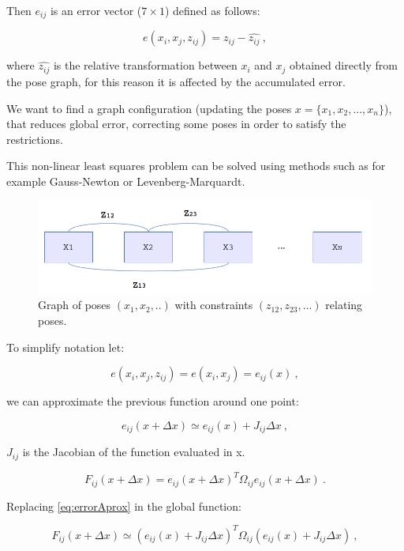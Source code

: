 Then $e_{ij}$ is an error vector ($7\times1$) defined as follows:

$$
e(x_i,x_j,z_{ij}) = z_{ij} - \hat{z_{ij}} \ ,
$$

\noindent where $\hat{z_{ij}}$ is the relative transformation between $x_i$ and $x_j$ obtained directly from the pose graph, for this reason 
it is affected by the accumulated error.

We want to find a graph configuration (updating the poses $x=\{x_1,x_2,...,x_n\}$), that reduces global error,
 correcting some poses in order to satisfy the restrictions.

This  non-linear least squares problem can be solved using 
methods such as for example Gauss-Newton or Levenberg-Marquardt.

\begin{figure}[!h]
\begin{center}
\includegraphics[scale=1.5]{images/graph_diagram2}
\caption{Graph of poses $(x_1,x_2,..)$ with constraints $(z_{12},z_{23},...)$ relating poses.}
\end{center}
\end{figure}

To simplify notation let: 

$$
e(x_i,x_j,z_{ij}) = e(x_i,x_j) = e_{ij}(x) \ ,
$$

\noindent we can approximate the previous function around one point:

\begin{equation}
\label{eq:errorAprox}
e_{ij}(x + \Delta x) \simeq e_{ij}(x) + J_{ij} \Delta x \ ,
\end{equation}

\noindent $J_{ij}$ is the Jacobian of the function evaluated in x. 


\begin{equation}
\label{eq:globalFunc}
F_{ij}(x + \Delta x) = e_{ij}(x + \Delta x)^T \Omega_{ij}  e_{ij}(x + \Delta x) \ .
\end{equation}

\noindent Replacing \ref{eq:errorAprox} in the global function:

\begin{equation}
\label{eq:globalFuncAprox}
F_{ij}(x + \Delta x) \simeq (e_{ij}(x) + J_{ij} \Delta x)^T \Omega_{ij}  (e_{ij}(x) + J_{ij} \Delta x) \ ,
\end{equation}

